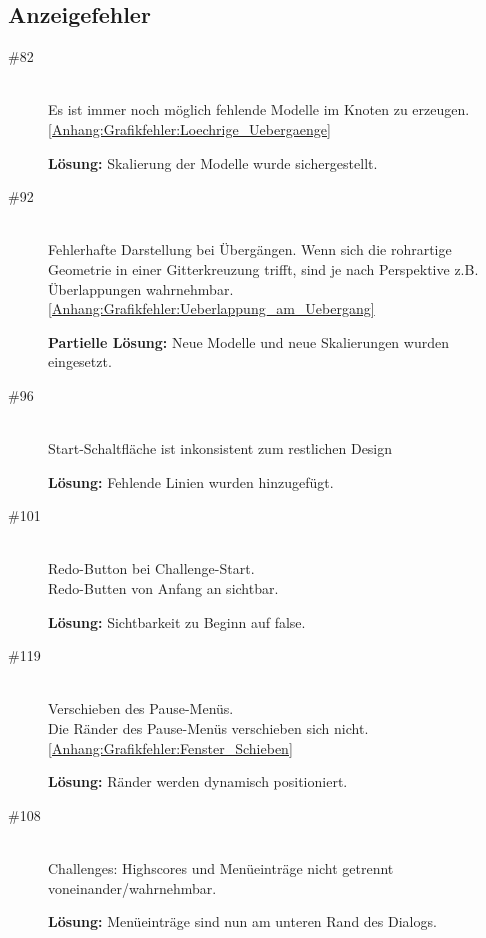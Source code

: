 %



\clearpage



\label{Anhang:Anzeigefehler}



\subsection*{Anzeigefehler}



\begin{description}


\item[\#82] \hfill \\
Es ist immer noch möglich \glqq fehlende Modelle im Knoten zu erzeugen\grqq. \ref{Anhang:Grafikfehler:Loechrige_Uebergaenge}

{\bfseries Lösung:} Skalierung der Modelle wurde sichergestellt.


\item[\#92] \hfill \\
Fehlerhafte Darstellung bei Übergängen. Wenn sich die rohrartige Geometrie in einer Gitterkreuzung trifft, sind je nach Perspektive z.B. Überlappungen wahrnehmbar. \ref{Anhang:Grafikfehler:Ueberlappung_am_Uebergang}

{\bfseries Partielle Lösung:} Neue Modelle und neue Skalierungen wurden eingesetzt.


\item[\#96] \hfill \\
\glqq Start\grqq-Schaltfläche ist inkonsistent zum restlichen Design

{\bfseries Lösung:} Fehlende Linien wurden hinzugefügt.


\item[\#101] \hfill \\
Redo-Button bei Challenge-Start.\\
Redo-Butten von Anfang an sichtbar.
 
{\bfseries Lösung:} Sichtbarkeit zu Beginn auf \glqq false\grqq.


\item[\#119] \hfill \\
Verschieben des Pause-Menüs. \\
Die Ränder des Pause-Menüs verschieben sich nicht. \ref{Anhang:Grafikfehler:Fenster_Schieben}

{\bfseries Lösung:} Ränder werden dynamisch positioniert. 


\item[\#108] \hfill \\
Challenges: Highscores und Menüeinträge nicht getrennt voneinander/wahrnehmbar.
 
{\bfseries Lösung:} Menüeinträge sind nun am unteren Rand des Dialogs.
 
 
\end{description}



~\\


